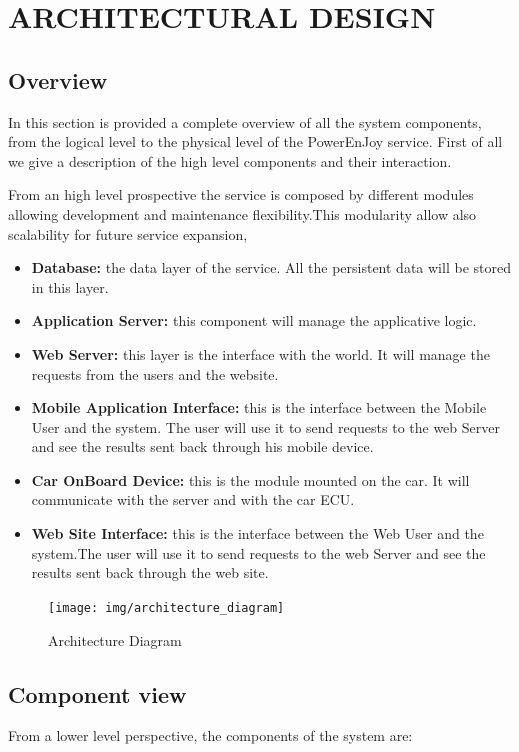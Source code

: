 \section{ARCHITECTURAL DESIGN}
\subsection{Overview} 
In this section is provided a complete overview of all the system components, from the logical level to the physical level of the PowerEnJoy service. First of all we give a description of the high level components and their interaction.\newline

\noindent From an high level prospective the service is composed by different modules allowing development and maintenance flexibility.This modularity allow also scalability for future service expansion,  \newline


\begin{itemize}
\item{\textbf{Database:}} the data layer of the service. All the persistent data will be stored in this layer.
\item{\textbf{Application Server:}} this component will manage the applicative logic.
\item{\textbf{Web Server:}} this layer is the interface with the world. It will manage the requests from the users and the website.
\item{\textbf{Mobile Application Interface:}} this is the interface between the Mobile User and the system. The user will use it to send requests to the web Server and see the results sent back through his mobile device. 
\item{\textbf{Car OnBoard Device:}} this is the module mounted on the car. It will communicate with the server and with the car ECU.
\item{\textbf{Web Site Interface:}} this is the interface between the Web User and the system.The user will use it to send requests to the web Server and see the results sent back through the web site. 
\end{itemize}

	\begin{figure}[H]	
	\centering
	\texttt{[image: img/architecture\_diagram]}
	\caption{Architecture Diagram}
\end{figure}


\newpage
\subsection{Component view} 
From a lower level perspective, the components of the system are:

